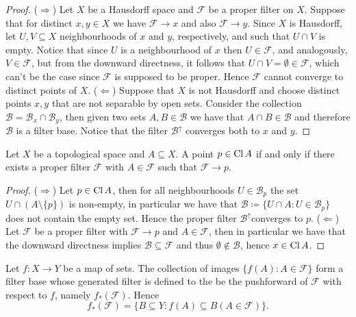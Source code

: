 \begin{proof}
  (\(\Rightarrow\)) Let \(X\) be a Hausdorff space and \(\mathcal F\) be a
  proper filter on \(X\). Suppose that for distinct \(x, y \in X\) we have
  \(\mathcal F \to x\) and also \(\mathcal F \to y\). Since \(X\) is Hausdorff,
  let \(U, V \subseteq X\) neighbourhoods of \(x\) and \(y\), respectively, and
  such that \(U \cap V\) is empty. Notice that since \(U\) is a neighbourhood of
  \(x\) then \(U \in \mathcal F\), and analogously, \(V \in \mathcal F\), but
  from the downward directness, it follows that \(U \cap V = \emptyset \in
  \mathcal F\), which can't be the case since \(\mathcal F\) is supposed to be
  proper. Hence \(\mathcal F\) cannot converge to distinct points of \(X\).
  (\(\Leftarrow\)) Suppose that \(X\) is not Hausdorff and choose distinct
  points \(x, y\) that are not separable by open sets. Consider the collection
  \(\mathcal B = \mathcal B_x \cap \mathcal B_y\), then given two sets \(A, B
  \in \mathcal B\) we have that \(A \cap B \in \mathcal B\) and therefore
  \(\mathcal B\) is a filter base. Notice that the filter \(\mathcal B^\uparrow\)
  converges both to \(x\) and \(y\).
\end{proof}

\begin{proposition}[Closed]\label{prop: closed from filter}
  Let \(X\) be a topological space and \(A \subseteq X\). A point \(p \in
  \operatorname{Cl} A\) if and only if there exists a proper filter \(\mathcal F\) with
  \(A \in \mathcal F\) such that \(\mathcal F \to p\).
\end{proposition}

\begin{proof}
  (\(\Rightarrow\)) Let \(p \in \operatorname{Cl} A\), then for all neighbourhoods \(U
  \in \mathcal B_p\) the set \(U \cap (A \setminus \{p\})\) is non-empty, in
  particular we have that \(\mathcal B \coloneq \{U \cap A \colon U \in \mathcal B_p\}\)
  does not contain the empty set. Hence the proper filter \(\mathcal
  B^\uparrow\)converges to \(p\). (\(\Leftarrow\)) Let \(\mathcal F\) be a
  proper filter with \(\mathcal F \to p\) and \(A \in \mathcal F\), then in
  particular we have that the downward directness implies \(\mathcal B \subseteq
  \mathcal F\) and thus \(\emptyset \not\in \mathcal B\), hence \(x \in
  \operatorname{Cl} A\).
\end{proof}

\begin{definition}\label{def: pushforward of filters}
  Let \(f: X \to Y\) be a map of sets. The collection of images \(\{f(A) \colon A \in
  \mathcal F\}\) form a filter base whose generated filter is defined to the be
  the pushforward of \(\mathcal F\) with respect to \(f\), namely
  \(f_\ast(\mathcal F)\). Hence
  \[
    f_\ast(\mathcal F) = \{B \subseteq Y \colon f(A) \subseteq B (A \in \mathcal
    F)\}.
  \]
\end{definition}

